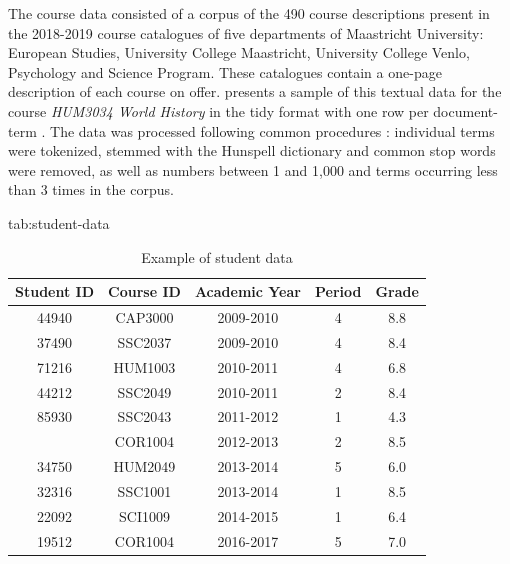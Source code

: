 \documentclass[pmlr]{jmlr}%
\begin{document}
The course data consisted of a corpus of the 490 course descriptions present in the 2018-2019 course catalogues of five departments of Maastricht University: European Studies, University College Maastricht, University College Venlo, Psychology and Science Program. These catalogues contain a one-page description of each course on offer.  presents a sample of this textual data for the course \textit{HUM3034 World History} in the tidy format with one row per document-term \citep{Wickham.2014}. The data was processed following common procedures \citep{Meyer.2008}: individual terms were tokenized, stemmed with the Hunspell dictionary and common stop words were removed, as well as numbers between 1 and 1,000 and terms occurring less than 3 times in the corpus.

\begin{table}[hbtp]
	\floatconts
	{tab:student-data}
	{\caption{Example of student data}}	
	{\begin{tabular}{ccccc}
		\toprule
		\bfseries Student ID &\bfseries Course ID &\bfseries Academic Year &\bfseries Period &\bfseries Grade\\
		\midrule
		44940 & CAP3000 & 2009-2010 & 4 & 8.8\\
		37490 & SSC2037 & 2009-2010 & 4 & 8.4\\
		71216 & HUM1003 & 2010-2011 & 4 & 6.8\\
		44212 & SSC2049 & 2010-2011 & 2 & 8.4\\
		85930 & SSC2043 & 2011-2012 & 1 & 4.3\\
		\addlinespace
		14492 & COR1004 & 2012-2013 & 2 & 8.5\\
		34750 & HUM2049 & 2013-2014 & 5 & 6.0\\
		32316 & SSC1001 & 2013-2014 & 1 & 8.5\\
		22092 & SCI1009 & 2014-2015 & 1 & 6.4\\
		19512 & COR1004 & 2016-2017 & 5 & 7.0\\
		\bottomrule
	\end{tabular}}	
\end{table}
\end{document}

